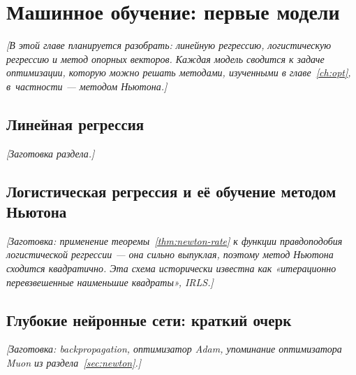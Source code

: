 \chapter{Машинное обучение: первые модели}
\label{ch:ml}

\textit{[В этой главе планируется разобрать:
линейную регрессию, логистическую регрессию и метод опорных векторов.
Каждая модель сводится к задаче оптимизации, которую можно решать
методами, изученными в главе~\ref{ch:opt}, в~частности — методом Ньютона.]}

\section{Линейная регрессия}
\textit{[Заготовка раздела.]}

\section{Логистическая регрессия и её обучение методом Ньютона}
\textit{[Заготовка: применение теоремы~\ref{thm:newton-rate} к функции
правдоподобия логистической регрессии — она сильно выпуклая, поэтому
метод Ньютона сходится квадратично. Эта схема исторически известна
как «итерационно перевзвешенные наименьшие квадраты», IRLS.]}

\section{Глубокие нейронные сети: краткий очерк}
\textit{[Заготовка: backpropagation, оптимизатор Adam, упоминание
оптимизатора Muon из раздела~\ref{sec:newton}.]}
